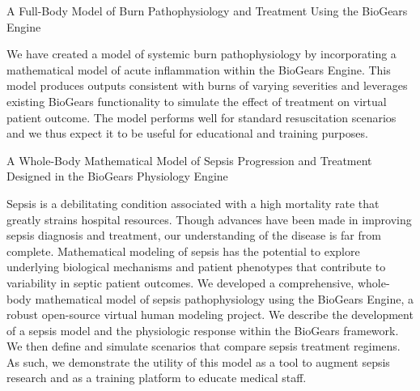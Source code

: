 \begin{refsection}
    \nocite{baird2013electro}

	\newrefcontext[sorting=nyt]
	\printbibliography[heading=none]
\end{refsection}


\begin{refsection}
    \nocite{baird2025Automated}
    \nocite{baird2025Lactate}
    \nocite{baird2025Gender}
    \nocite{baird2025Physical}
    \nocite{Gong2025Physiology}
	\newrefcontext[sorting=nyt]
	\printbibliography[heading=none]
\end{refsection}


  \cventry
    {A Full-Body Model of Burn Pathophysiology and Treatment Using the BioGears Engine} %
    {} %
    {} %
    {} %
     {
    \begin{cvitems} %
    \item {We have created a model of systemic burn pathophysiology by incorporating a mathematical model of acute inflammation within the BioGears Engine. This model produces outputs consistent with burns of varying severities and leverages existing BioGears functionality to simulate the effect of treatment on virtual patient outcome. The model performs well for standard resuscitation scenarios and we thus expect it to be useful for educational and training purposes.}
    \end{cvitems}
     }

  \cventry
    {A Whole-Body Mathematical Model of Sepsis Progression and Treatment Designed in the BioGears Physiology Engine} %
    {} %
    {} %
    {} %
     {
    \begin{cvitems} %
    \item {Sepsis is a debilitating condition associated with a high mortality rate that greatly strains hospital resources. Though advances have been made in improving sepsis diagnosis and treatment, our understanding of the disease is far from complete. Mathematical modeling of sepsis has the potential to explore underlying biological mechanisms and patient phenotypes that contribute to variability in septic patient outcomes. We developed a comprehensive, whole-body mathematical model of sepsis pathophysiology using the BioGears Engine, a robust open-source virtual human modeling project. We describe the development of a sepsis model and the physiologic response within the BioGears framework. We then define and simulate scenarios that compare sepsis treatment regimens. As such, we demonstrate the utility of this model as a tool to augment sepsis research and as a training platform to educate medical staff.}
    \end{cvitems}
     }

